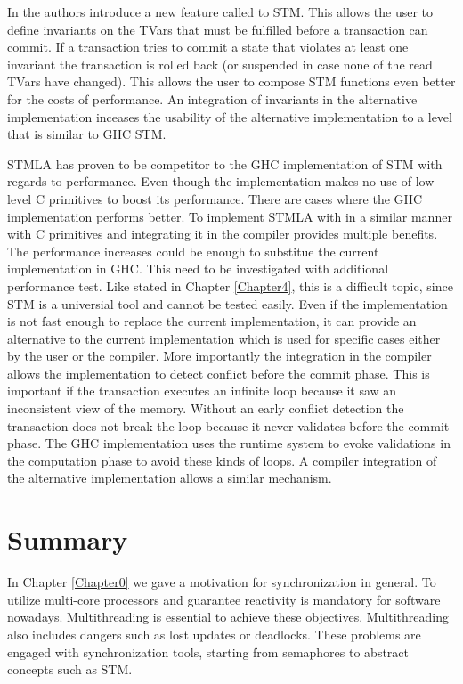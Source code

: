 In \parencite{invariants} the authors introduce a new feature called  to STM.
This allows the user to define invariants on the TVars that must be fulfilled before a transaction
can commit. If a transaction tries to commit a state that violates at least one invariant the 
transaction is rolled back (or suspended in case none of the read TVars have changed). This allows
the user to compose STM functions even better for the costs of performance. An integration of 
invariants in the alternative implementation inceases the usability of the alternative implementation
to a level that is similar to GHC STM.

STMLA has proven to be competitor to the GHC implementation of STM with regards to performance. Even 
though the implementation makes no use of low level C primitives to boost its performance. There are 
cases where the GHC implementation performs better. To implement STMLA with in a similar manner 
with C primitives and integrating it in the compiler provides multiple benefits. The performance 
increases could be enough to substitue the current implementation in GHC. This need to be investigated
with additional performance test. Like stated in Chapter \ref{Chapter4}, this is a difficult topic,
since STM is a universial tool and cannot be tested easily. Even if the implementation is not fast
enough to replace the current implementation, it can provide an alternative to the current implementation
which is used for specific cases either by the user or the compiler. More importantly the integration
in the compiler allows the implementation to detect conflict before the commit phase. This is 
important if the transaction executes an infinite loop because it saw an inconsistent view of the 
memory. Without an early conflict detection the transaction does not break the loop because it never
validates before the commit phase. The GHC implementation uses the runtime system to evoke validations
in the computation phase to avoid these kinds of loops. A compiler integration of the alternative 
implementation allows a similar mechanism.

\section{Summary}
In Chapter \ref{Chapter0} we gave a motivation for synchronization in general. To utilize multi-core
processors and guarantee reactivity is mandatory for software nowadays. Multithreading is essential 
to achieve these objectives. Multithreading also includes dangers such as lost updates or deadlocks. 
These problems are engaged with synchronization tools, starting from semaphores to abstract concepts
such as STM.

